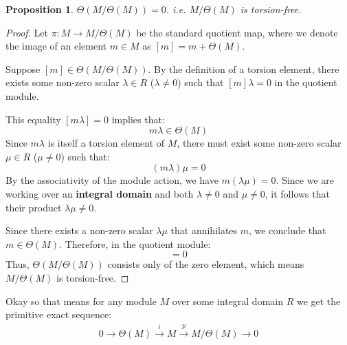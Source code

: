 \documentclass[12pt]{book}
\newtheorem{proposition}[theorem]{Proposition}
\theoremstyle{definition}
\begin{document}
\begin{proposition}
    $\Theta (M/\Theta(M)) = 0$. i.e. $M/\Theta(M)$ is torsion-free. 
\end{proposition}
\begin{proof}
Let $\pi: M \to M/\Theta(M)$ be the standard quotient map, where we denote the image of an element $m \in M$ as $[m] = m + \Theta(M)$. 

Suppose $[m] \in \Theta(M/\Theta(M))$. By the definition of a torsion element, there exists some non-zero scalar $\lambda \in R$ ($\lambda \neq 0$) such that $[m]\lambda = 0$ in the quotient module. 

This equality $[m\lambda] = 0$ implies that:
\begin{equation*}
    m\lambda \in \Theta(M)
\end{equation*}
Since $m\lambda$ is itself a torsion element of $M$, there must exist some non-zero scalar $\mu \in R$ ($\mu \neq 0$) such that:
\begin{equation*}
    (m\lambda)\mu = 0
\end{equation*}
By the associativity of the module action, we have $m(\lambda\mu) = 0$. Since we are working over an \textbf{integral domain} and both $\lambda \neq 0$ and $\mu \neq 0$, it follows that their product $\lambda\mu \neq 0$.

Since there exists a non-zero scalar $\lambda\mu$ that annihilates $m$, we conclude that $m \in \Theta(M)$. Therefore, in the quotient module:
\begin{equation*}
    [m] = 0
\end{equation*}
Thus, $\Theta(M/\Theta(M))$ consists only of the zero element, which means $M/\Theta(M)$ is torsion-free.
\end{proof}

\hspace{0.5cm}

Okay so that means for any module $M$ over some integral domain $R$ we get the primitive exact sequence: 
\begin{align*}
    0 \rightarrow \Theta(M) \xrightarrow{i} M \xrightarrow{p} M/\Theta(M) \rightarrow 0
\end{align*}
\end{document}
